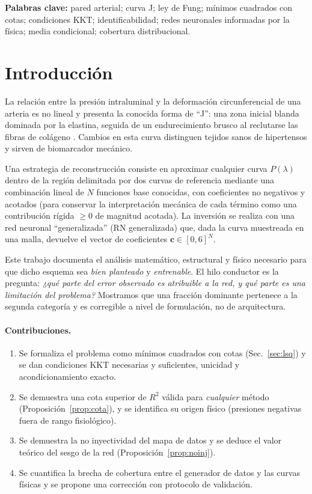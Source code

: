 \documentclass[11pt,twoside]{article}
\theoremstyle{definition}
\theoremstyle{remark}
\begin{document}
\noindent\textbf{Palabras clave:} pared arterial; curva J; ley de Fung; mínimos cuadrados con cotas; condiciones KKT; identificabilidad; redes neuronales informadas por la física; media condicional; cobertura distribucional.

\tableofcontents
\newpage

\section{Introducción}
La relación entre la presión intraluminal y la deformación circunferencial de una arteria es no lineal y presenta la conocida forma de ``J'': una zona inicial blanda dominada por la elastina, seguida de un endurecimiento brusco al reclutarse las fibras de colágeno \cite{Fung1967,Humphrey2002,Holzapfel2000}. Cambios en esta curva distinguen tejidos sanos de hipertensos y sirven de biomarcador mecánico.

Una estrategia de reconstrucción consiste en aproximar cualquier curva $P(\lambda)$ dentro de la región delimitada por dos curvas de referencia mediante una combinación lineal de $N$ funciones base conocidas, con coeficientes no negativos y acotados (para conservar la interpretación mecánica de cada término como una contribución rígida $\ge 0$ de magnitud acotada). La inversión se realiza con una red neuronal ``generalizada'' (RN generalizada) que, dada la curva muestreada en una malla, devuelve el vector de coeficientes $\bm c\in[0,6]^N$.

Este trabajo documenta el análisis matemático, estructural y físico necesario para que dicho esquema sea \emph{bien planteado} y \emph{entrenable}. El hilo conductor es la pregunta: \emph{¿qué parte del error observado es atribuible a la red, y qué parte es una limitación del problema?} Mostramos que una fracción dominante pertenece a la segunda categoría y es corregible a nivel de formulación, no de arquitectura.

\paragraph{Contribuciones.}
\begin{enumerate}
\item Se formaliza el problema como mínimos cuadrados con cotas (Sec.~\ref{sec:lsq}) y se dan condiciones KKT necesarias y suficientes, unicidad y acondicionamiento exacto.
\item Se demuestra una cota superior de $R^2$ válida para \emph{cualquier} método (Proposición~\ref{prop:cota}), y se identifica su origen físico (presiones negativas fuera de rango fisiológico).
\item Se demuestra la no inyectividad del mapa de datos y se deduce el valor teórico del sesgo de la red (Proposición~\ref{prop:noinj}).
\item Se cuantifica la brecha de cobertura entre el generador de datos y las curvas físicas y se propone una corrección con protocolo de validación.
\end{enumerate}
\end{document}
